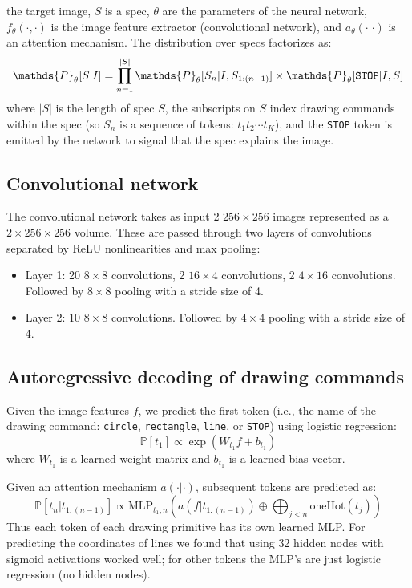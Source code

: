\documentclass{article}
\newcommand{\probability}{\mathds{P}} %
\begin{document}
the target image, $S$ is a spec, $\theta$ are the
parameters of the neural network, $f_\theta(\cdot,\cdot)$ is the
image feature extractor (convolutional network), and $a_\theta(\cdot|\cdot)$ is an attention mechanism. The distribution over
specs factorizes as:
\begin{equation}
  \probability_\theta [S|I] = \prod_{n = 1}^{|S|} \probability_\theta [S_n | I,S_{1:(n-1)}]\times\probability_\theta [\verb|STOP| | I,S]\label{objective}
\end{equation}
where $|S|$ is the length of spec $S$, the subscripts
on $S$ index drawing commands within the spec (so $S_n$ is a sequence of tokens: $t_1t_2\cdots t_K$), and the \verb|STOP|
token is emitted by the network to signal that the spec
explains the image.

\subsection{Convolutional network}\label{CNNarchitecture}
The convolutional network takes as input 2 $256\times 256$ images
represented as a $2\times 256\times 256$ volume. These are
passed through two layers of convolutions separated by ReLU
nonlinearities and max pooling:
\begin{itemize}
\item Layer 1: 20 $8\times 8$ convolutions, 2 $16\times 4$ convolutions, 2 $4\times 16$ convolutions. Followed by $8\times 8$ pooling with a stride size of 4.
\item Layer 2: 10 $8\times 8$ convolutions. Followed by $4\times 4$ pooling with a stride size of 4.
\end{itemize}


\subsection{Autoregressive decoding of drawing commands}

Given the image features $f$, we predict the first token (i.e., the name of the drawing command: \verb|circle|, \verb|rectangle|, \verb|line|, or \verb|STOP|) using logistic regression:
\begin{equation}
  \probability [t_1]\propto \exp\left( W_{t_1}f + b_{t_1}\right)
\end{equation}
where $W_{t_1}$ is a learned weight matrix and  $b_{t_1}$ is a learned bias vector.

Given an attention mechanism $a(\cdot | \cdot)$, subsequent tokens are predicted as:
\begin{equation}
  \probability [t_n|t_{1:(n - 1)}]\propto \text{MLP}_{t_1,n}(a(f|t_{1:(n - 1)}) \oplus \bigoplus_{j < n} \text{oneHot}(t_j))\label{discreteTokenPrediction}
\end{equation}
Thus each token of each drawing primitive has its own learned MLP.
For predicting the coordinates of lines we found that using 32 hidden nodes with sigmoid activations worked well;
for other tokens the MLP's are just logistic regression (no hidden nodes).
\end{document}
